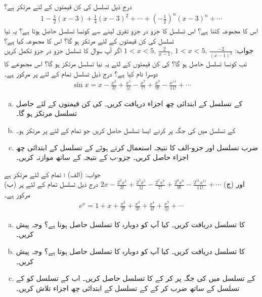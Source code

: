 درج ذیل تسلسل  کی کن قیمتوں کے لئے مرتکز ہے؟
\begin{align*}
1-\frac{1}{2}(x-3)+\frac{1}{4}(x-3)^2+\cdots+(-\frac{1}{2})^n(x-3)^n+\cdots
\end{align*}
اس کا مجموعہ کتنا ہے؟ اس تسلسل کا جزو در جزو تفرق لینے سے کونسا تسلسل حاصل ہوتا ہے؟ یہ نیا تسلسل  کی کن قیمتوں کے لئے مرتکز ہو گا؟ اس کا مجموعہ کیا ہے؟\\
جواب:\quad
$1<x<5,\,\tfrac{2}{x-1},\, 1<x<5,\,\tfrac{-2}{(x-1)^2}$
اگر آپ سوال  کا تسلسل جزو در جزو تکمل کریں تب کونسا تسلسل حاصل ہو گا؟  کی کن قیمتوں کے لئے یہ نیا تسلسل مرتکز ہو گا؟ اس مجموعے کا دوسرا نام کیا ہے؟
درج ذیل تسلسل تمام  کے لئے  پر مرکوز ہے۔
\begin{align*}
\sin x=x-\frac{x^3}{3!}+\frac{x^5}{5!}-\frac{x^7}{7!}+\frac{x^9}{9!}-\frac{x^{11}}{11!}+\cdots
\end{align*}
\begin{enumerate}[a.]
\item
  کے تسلسل کے ابتدائی چھ اجزاء دریافت کریں۔  کی کن قیمتوں کے لئے حاصل تسلسل مرتکز ہو گا۔  
\item
{} کے تسلسل میں  کی جگہ  پر کرنے ایسا تسلسل حاصل کریں جو تمام  کے لئے  پر مرتکز ہو۔
\item
ضرب تسلسل اور جزو-الف کا نتیجہ استعمال کرتے ہوئے  کے تسلسل کے ابتدائی چھ اجزاء حاصل کریں۔ جزو-ب کے نتیجہ کے ساتھ موازنہ کریں۔
\end{enumerate}
جواب:\quad
(الف)  ؛ تمام  کے لئے مرتکز ہے\\
  (ب) اور (ج) $2x-\tfrac{2^3x^3}{3!}+\tfrac{2^5x^5}{5!}-\tfrac{2^7x^7}{7!}+\tfrac{2^9x^9}{9!}-\tfrac{2^{11}x^{11}}{11!}+\cdots$
درج ذیل تسلسل تمام  کے لئے  پر مرکوز ہے۔
\begin{align*}
e^x=1+x+\frac{x^2}{2!}+\frac{x^3}{3!}+\frac{x^4}{4!}+\frac{x^5}{5!}+\cdots
\end{align*}
\begin{enumerate}[a.]
\item
{} کا تسلسل دریافت کریں۔ کیا آپ کو دوبارہ  کا تسلسل حاصل ہوتا ہے؟ وجہ پیش کریں۔
\item
{} کا تسلسل دریافت کریں۔ کیا آپ کو دوبارہ  کا تسلسل حاصل ہوتا ہے؟ وجہ پیش کریں۔
\item
{} کے تسلسل میں  کی جگہ  پر کر کے  کا تسلسل حاصل کریں۔ اب  کے تسلسل کو   کے تسلسل کے ساتھ ضرب کر کے  کے تسلسل کے ابتدائی چھ اجزاء تلاش کریں۔
\end{enumerate}
